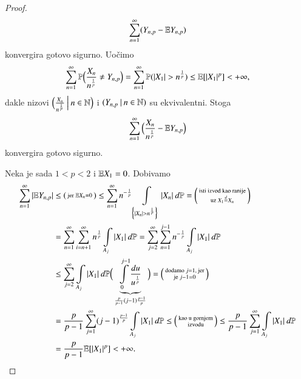 \begin{proof}
    \begin{equation*}
        \sum\limits_{n = 1}^{\infty} (Y_{n, p} - \mathbb{E} Y_{n, p})
    \end{equation*}
    konvergira gotovo sigurno.
    Uo\v cimo
    \begin{equation*}
        \sum\limits_{n = 1}^{\infty} \mathbb{P} \Big( \frac{X_n}{n^\frac{1}{p}} \neq Y_{n, p} \Big) = \sum\limits_{n = 1}^{\infty} \mathbb{P} (|X_1| > n^\frac{1}{p}) \leq \mathbb{E} [ |X_1|^p ] < +\infty,
    \end{equation*}
    dakle nizovi $\Big( {\frac{X_n}{n^\frac{1}{p}}} \: \Big| \: {n \in \mathbb{N}} \Big)$ i $({Y_{n, p}} \: | \: {n \in \mathbb{N}})$ su ekvivalentni.
    Stoga
    \begin{equation*}
        \sum\limits_{n = 1}^{\infty} \Big( \frac{X_n}{n^\frac{1}{p}} - \mathbb{E} Y_{n, p} \Big)
    \end{equation*}
    konvergira gotovo sigurno.

    Neka je sada $1 < p < 2$ i $\mathbb{E} X_1 = 0$.
    Dobivamo
    \begin{equation*}
        \begin{aligned}
            \sum\limits_{n = 1}^{\infty} |\mathbb{E} Y_{n, p}| &\leq
            \begin{psmallmatrix}
                \textnormal{jer } \mathbb{E} X_n = 0
            \end{psmallmatrix}
            \leq \sum\limits_{n = 1}^{\infty} n^{-\frac{1}{p}}
            \int\limits_{\Big\{ |X_n| > n^\frac{1}{p} \Big\}} |X_n| \: d \mathbb{P} =
            \begin{psmallmatrix}
                \textnormal{isti izvod kao ranije}\\
                \textnormal{uz } X_1 \overset{d}{=} X_n
            \end{psmallmatrix}\\
            &= \sum\limits_{n = 1}^{\infty} \sum\limits_{i = n + 1}^{\infty} n^\frac{1}{p} \int\limits_{A_j} |X_1| \: d \mathbb{P} = \sum\limits_{j = 2}^{\infty} \sum\limits_{n = 1}^{j - 1} n^{-\frac{1}{p}} \int\limits_{A_j} |X_1| \: d \mathbb{P}\\
            &\leq \sum\limits_{j = 2}^{\infty} \int\limits_{A_j} |X_1| \: d \mathbb{P} \Big( \underbrace{\int\limits_0^{j-1} \frac{du}{u^\frac{1}{p}} }_{\frac{p}{p - 1} (j - 1)\frac{p - 1}{p}} \Big) =
            \begin{psmallmatrix}
                \textnormal{dodamo } j = 1 \textnormal{, jer}\\
                \textnormal{je } j - 1 = 0
            \end{psmallmatrix}\\
            &= \frac{p}{p - 1} \sum\limits_{j = 1}^{\infty} (j - 1)^\frac{p - 1}{p} \int\limits_{A_j} |X_1| \: d \mathbb{P} \leq
            \begin{psmallmatrix}
                \textnormal{kao u gornjem}\\
                \textnormal{izvodu}
            \end{psmallmatrix}
            \leq \frac{p}{p - 1} \sum\limits_{j = 1}^{\infty} \int\limits_{A_j} |X_1| \: d \mathbb{P}\\
            &= \frac{p}{p - 1} \mathbb{E} [ |X_1|^p ] < + \infty.
        \end{aligned}
    \end{equation*}
\end{proof}

